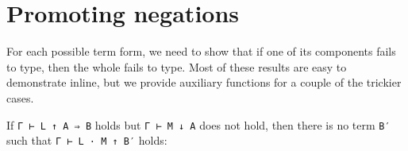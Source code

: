 \hypertarget{promoting-negations}{%
\section{Promoting negations}\label{promoting-negations}}

For each possible term form, we need to show that if one of its
components fails to type, then the whole fails to type. Most of these
results are easy to demonstrate inline, but we provide auxiliary
functions for a couple of the trickier cases.

If \texttt{Γ\ ⊢\ L\ ↑\ A\ ⇒\ B} holds but \texttt{Γ\ ⊢\ M\ ↓\ A} does
not hold, then there is no term \texttt{B′} such that
\texttt{Γ\ ⊢\ L\ ·\ M\ ↑\ B′} holds:

\begin{fence}
\begin{code}%
\>[0]\AgdaSpace{}%
\AgdaSymbol{:}\AgdaSpace{}%
\AgdaSpace{}%
\AgdaSymbol{\{}\AgdaSpace{}%
\AgdaSpace{}%
\AgdaSpace{}%
\AgdaSpace{}%
\AgdaSymbol{\}}\<%
\\
\>[0][@{}l@{\AgdaIndent{0}}]%
\>[2]\AgdaSpace{}%
\AgdaSpace{}%
\AgdaSpace{}%
\AgdaSpace{}%
\AgdaSpace{}%
\AgdaSpace{}%
\AgdaSpace{}%
\<%
\\
%
\>[2]%
\>[851I]\AgdaSpace{}%
\AgdaSpace{}%
\AgdaSpace{}%
\AgdaSpace{}%
\AgdaSpace{}%
\<%
\\
\>[.][@{}l@{}]\<[851I]%
\>[4]\AgdaComment{-------------------------}\<%
\\
%
\>[2]\AgdaSpace{}%
\AgdaSpace{}%
\AgdaFunction{∃[}\AgdaSpace{}%
\AgdaSpace{}%
\AgdaFunction{]}\AgdaSymbol{(}\AgdaSpace{}%
\AgdaSpace{}%
\AgdaSpace{}%
\AgdaSpace{}%
\AgdaSpace{}%
\AgdaSpace{}%
\AgdaSymbol{)}\<%
\\
\>[0]\AgdaSpace{}%
\AgdaSpace{}%
\AgdaSpace{}%
\AgdaSpace{}%
\AgdaSpace{}%
\AgdaOperator{\AgdaInductiveConstructor{,}}\AgdaSpace{}%
\AgdaSpace{}%
\AgdaSpace{}%
\AgdaSpace{}%
\AgdaSpace{}%
\AgdaSpace{}%
\AgdaSpace{}%
\AgdaSymbol{(}\AgdaSpace{}%
\AgdaSpace{}%
\AgdaSymbol{)}\AgdaSpace{}%
\AgdaSymbol{=}\AgdaSpace{}%
\AgdaSpace{}%
\<%
\end{code}
\end{fence}

